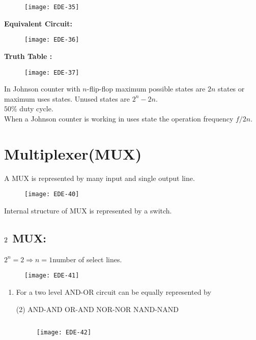 \begin{enumerate}
\begin{figure}[H]
	\centering
	\texttt{[image: EDE-35]}
\end{figure}
\textbf { Equivalent Circuit: }
\begin{figure}[H]
	\centering
	\texttt{[image: EDE-36]}
\end{figure}
\textbf { Truth Table : }
\begin{figure}[H]
	\centering
	\texttt{[image: EDE-37]}
\end{figure}
In Johnson counter with $n$-flip-flop maximum possible states are $2 n$ states or maximum uses states. Unused states are $2^{n}-2 n$.\\
$50 \%$ duty cycle.\\
When a Johnson counter is working in uses state the operation frequency $f / 2 n$.\\
 \end{enumerate}
\section{Multiplexer(MUX)}
A MUX is represented by many input and single output line.
\begin{figure}[H]
	\centering
	\texttt{[image: EDE-40]}
\end{figure}
Internal structure of MUX is represented by a switch.
\subsection{{$2\time 1$ MUX:}}
	$2^n=2\Rightarrow n=1$\quad number of select lines.
	\begin{figure}[H]
		\centering
		\texttt{[image: EDE-41]}
	\end{figure}
	\begin{enumerate}
	\item For a two level AND-OR circuit can be equally represented by
	 \begin{tasks}(2)
		\task[\textbf{a.}]AND-AND
		\task[\textbf{b.}]OR-AND
		\task[\textbf{c.}]NOR-NOR
		\task[\textbf{d.}] NAND-NAND
	\end{tasks}
\begin{answer}$\left. \right. $\\
	\begin{figure}[H]
		\centering
		\texttt{[image: EDE-42]}
	\end{figure}
\end{answer}
\end{enumerate}
